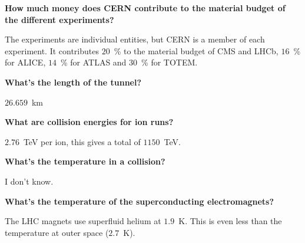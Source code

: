 \documentclass{atlasnote}
\newenvironment{question} %
{\noindent\bfseries}
{\par}
\newenvironment{answer} %
{}
{\vspace*{10pt}}
\newenvironment{faq} %
{\par\noindent\begin{minipage}{\linewidth}}
    {\end{minipage}\par}
\begin{document}
\begin{faq}
    \begin{question}
        How much money does CERN contribute to the material budget of the different experiments?
    \end{question}
    \begin{answer}
        The experiments are individual entities, but CERN is a member of each experiment. It contributes $20$~\% to the material budget of CMS and LHCb, $16$~\%
        for ALICE, $14$~\% for ATLAS and $30$~\% for TOTEM.
    \end{answer}
\end{faq}

\begin{faq}
    \begin{question}
        What's the length of the tunnel?
    \end{question}
    \begin{answer}
        $26.659$~km
    \end{answer}
\end{faq}

\begin{faq}
    \begin{question}
        What are collision energies for ion runs?
    \end{question}
    \begin{answer}
        $2.76$~TeV per ion, this gives a total of $1150$~TeV.
    \end{answer}
\end{faq}

\begin{faq}
    \begin{question}
        What's the temperature in a collision?
    \end{question}
    \begin{answer}
        I don't know.
    \end{answer}
\end{faq}

\begin{faq}
    \begin{question}
        What's the temperature of the superconducting electromagnets?
    \end{question}
    \begin{answer}
        The LHC magnets use superfluid helium at $1.9$~K. This is even less than the temperature at outer space ($2.7$~K).
    \end{answer}
\end{faq}
\end{document}
